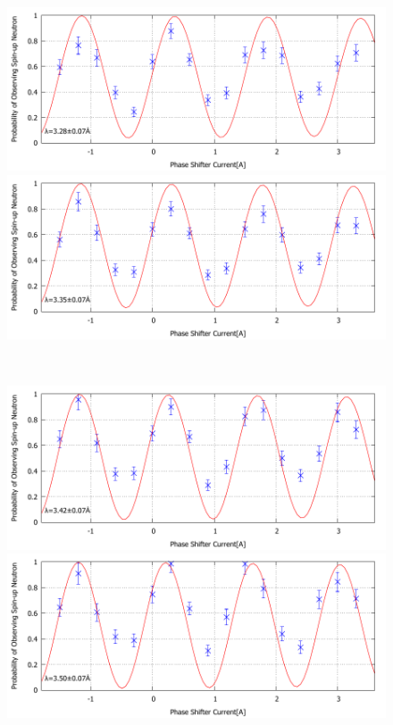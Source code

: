 \begin{figure}[h]
\begin{minipage}{0.5\hsize}
\end{minipage}\\
\begin{minipage}{0.5\hsize}
\includegraphics[width=\hsize]{analysis/GO/IT_e_460.pdf}
\end{minipage}
\begin{minipage}{0.5\hsize}
\includegraphics[width=\hsize]{analysis/GO/IT_e_470.pdf}
\end{minipage}\\
\begin{minipage}{0.5\hsize}
\includegraphics[width=\hsize]{analysis/GO/IT_e_480.pdf}
\end{minipage}
\begin{minipage}{0.5\hsize}
\includegraphics[width=\hsize]{analysis/GO/IT_e_490.pdf}

\end{minipage}
\end{figure}
